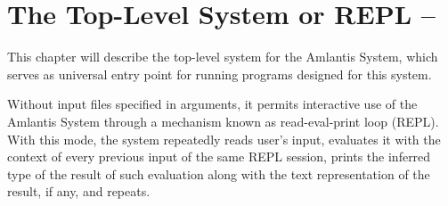 
\chapter[The Top-Level System or REPL -- aml]{The Top-Level System or REPL -- \ToolAml}
\label{ch:tools-aml}

This chapter will describe the top-level system for the Amlantis System, which serves as universal entry point for running programs designed for this system. 

Without input files specified in arguments, it permits interactive use of the Amlantis System through a mechanism known as read-eval-print loop (REPL). With this mode, the system repeatedly reads user's input, evaluates it with the context of every previous input of the same REPL session, prints the inferred type of the result of such evaluation along with the text representation of the result, if any, and repeats.






